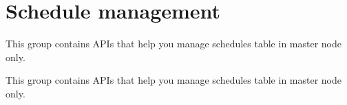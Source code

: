 \hypertarget{group__schedule__management__group}{}\section{Schedule management}
\label{group__schedule__management__group}


This group contains A\+P\+Is that help you manage schedules table in master node only.  


This group contains A\+P\+Is that help you manage schedules table in master node only. 

